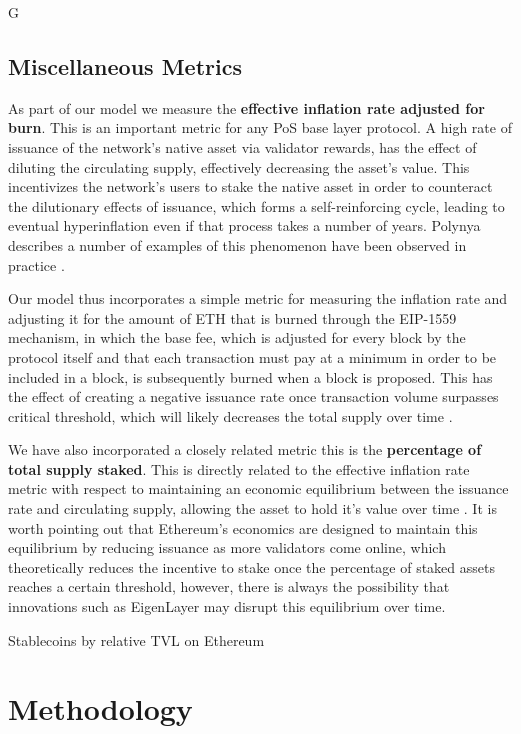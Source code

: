 G\documentclass[conference]{IEEEtran}
\begin{document}
\subsection{Miscellaneous Metrics}

As part of our model we measure the \textbf{effective inflation rate adjusted for burn}.  This is an important metric for any PoS base layer protocol.  A high rate of issuance of the network's native asset via validator rewards, has the effect of diluting the circulating supply, effectively decreasing the asset's value.  This incentivizes the network's users to stake the native asset in order to counteract the dilutionary effects of issuance, which forms a self-reinforcing cycle, leading to eventual hyperinflation even if that process takes a number of years.  Polynya describes a number of examples of this phenomenon have been observed in practice \cite{polynya2022}. 

Our model thus incorporates a simple metric for measuring the inflation rate and adjusting it for the amount of ETH that is burned through the EIP-1559 mechanism, in which the base fee, which is adjusted for every block by the protocol itself and that each transaction must pay at a minimum in order to be included in a block, is subsequently burned when a block is proposed.  This has the effect of  creating a negative issuance rate once transaction volume surpasses critical threshold, which will likely decreases the total supply over time \cite{liu2022empirical}.

We have also incorporated a closely related metric this is the \textbf{percentage of total supply staked}.  This is directly related to the effective inflation rate metric with respect to maintaining an economic equilibrium between the issuance rate and circulating supply, allowing the asset to hold it's value over time \cite{john2021equilibrium}.  It is worth pointing out that Ethereum's economics are designed to maintain this equilibrium by reducing issuance as more validators come online, which theoretically reduces the incentive to stake once the percentage of staked assets reaches a certain threshold, however, there is always the possibility that innovations such as EigenLayer may disrupt this equilibrium over time.

Stablecoins by relative TVL on Ethereum

\section*{Methodology}
\end{document}
